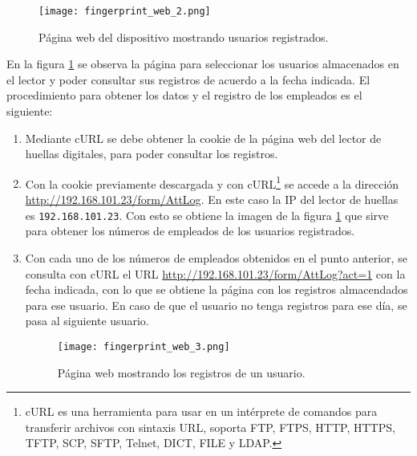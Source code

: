 \begin{figure}[htb]
 \begin{center}
  \texttt{[image: fingerprint\_web\_2.png]}
 \end{center}
 \caption{Página web del dispositivo mostrando usuarios registrados.}
 \label{fig:finger_print_8}
\end{figure}

En la figura \ref{fig:finger_print_8} se observa la página para seleccionar los usuarios almacenados en el lector y poder consultar sus registros de acuerdo a la fecha indicada. El procedimiento para obtener los datos y el registro de los empleados es el siguiente:

\begin{enumerate}
 \item Mediante cURL se debe obtener la cookie de la página web del lector de huellas digitales, para poder consultar los registros.
 \item Con la cookie previamente descargada y con cURL\footnote{cURL es una herramienta para usar en un intérprete de comandos para transferir archivos con sintaxis URL, soporta FTP, FTPS, HTTP, HTTPS, TFTP, SCP, SFTP, Telnet, DICT, FILE y LDAP.} se accede a la dirección \url{http://192.168.101.23/form/AttLog}. En este caso la IP del lector de huellas es \texttt{192.168.101.23}. Con esto se obtiene la imagen de la figura \ref{fig:finger_print_8} que sirve para obtener los números de empleados de los usuarios registrados.
 \item Con cada uno de los números de empleados obtenidos en el punto anterior, se consulta con cURL el URL \url{http://192.168.101.23/form/AttLog?act=1} con la fecha indicada, con lo que se obtiene la página con los registros almacendados para ese usuario. En caso de que el usuario no tenga registros para ese día, se pasa al siguiente usuario.
 
 \begin{figure}[htb]
 \begin{center}
  \texttt{[image: fingerprint\_web\_3.png]}
 \end{center}
 \caption{Página web mostrando los registros de un usuario.}
 \label{fig:finger_print_9}
\end{figure}
 

\end{enumerate}
